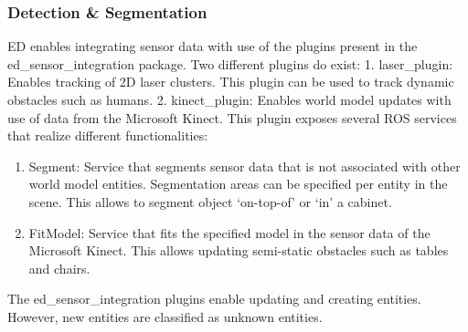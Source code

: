 \subsubsection{Detection \& Segmentation}
ED enables integrating sensor data with use of the plugins present in the ed\_sensor\_integration package. Two different plugins do exist:
1. laser\_plugin: Enables tracking of 2D laser clusters. This plugin can be used to track dynamic obstacles such as humans.
2. kinect\_plugin: Enables world model updates with use of data from the Microsoft Kinect\texttrademark. This plugin exposes several ROS services that realize different functionalities:
\begin{enumerate}[label=(\alph*)]
\item Segment: Service that segments sensor data that is not associated with other world model entities. Segmentation areas can be specified per entity in the scene. This allows to segment object ‘on-top-of’ or ‘in’ a cabinet.
\item FitModel: Service that fits the specified model in the sensor data of the Microsoft Kinect\texttrademark. This allows updating semi-static obstacles such as tables and chairs.
\end{enumerate}


The ed\_sensor\_integration plugins enable updating and creating entities. However, new entities are classified as unknown entities.
